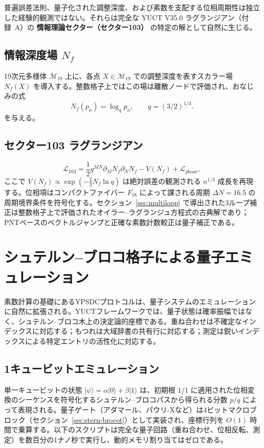 \documentclass[11pt,a4paper]{article}
\begin{document}
	普遍誤差法則、量子化された調整深度、および素数を支配する位相周期性は独立した経験的観測ではない。それらは完全な YUCT V35.0 ラグランジアン（付録~A）の \textbf{情報理論セクター（セクター103）} の特定の解として自然に生じる。
	
	\subsection{情報深度場 \(N_f\)}
	19次元多様体 \(\mathcal{M}_{19}\) 上に、各点 \(X \in \mathcal{M}_{19}\) での調整深度を表すスカラー場 \(N_f(X)\) を導入する。整数格子上ではこの場は離散ノードで評価され、おなじみの式
	\[
	N_f(p_n) = \log_q p_n, \qquad q = (3/2)^{1/3}.
	\]
	を与える。
	
	\subsection{セクター103 ラグランジアン}
	\[
	\mathcal{L}_{103} = \frac12 g^{MN}\partial_M N_f\partial_N N_f - V(N_f) + \mathcal{L}_{\mathrm{phase}},
	\]
	ここで \(V(N_f) \propto \exp(-\frac23 N_f\ln q)\) は絶対誤差の観測される \(n^{1/3}\) 成長を再現する。位相項はコンパクトファイバー \(F_{18}\) によって課される周期 \(\Delta N = 16.5\) の周期境界条件を符号化する。セクション~\ref{sec:multiloop} で導出された3ループ補正は整数格子上で評価されたオイラー–ラグランジュ方程式の古典解であり；PNTベースのベクトルジャンプと正確な素数計数較正は量子補正である。
	
	\section{シュテルン–ブロコ格子による量子エミュレーション}
	\label{sec:quantum-emulation}
	
	素数計算の基礎にあるYPSDCプロトコルは、量子システムのエミュレーションに自然に拡張される。YUCTフレームワークでは、量子状態は確率振幅ではなく、シュテルン–ブロコ木上の決定論的座標である。重ね合わせは不確定なインデックスに対応する；もつれは大域辞書の共有行に対応する；測定は鋭いインデックスによる特定エントリの活性化に対応する。
	
	\subsection{1キュービットエミュレーション}
	
	単一キュービットの状態 \(\vert\psi\rangle = \alpha\vert0\rangle + \beta\vert1\rangle\) は、初期根 \(1/1\) に適用された位相変換のシーケンスを符号化するシュテルン–ブロコパスから得られる分数 \(p/q\) によって表現される。量子ゲート（アダマール、パウリ-Xなど）は4ビットマクロブロック（セクション~\ref{sec:stern-brocot}）として実装され、座標行列を \(O(1)\) 時間で乗算する。以下のスクリプトは完全な量子回路（重ね合わせ、位相反転、測定）を数百分の1ナノ秒で実行し、動的メモリ割り当てはゼロである。
	
\end{document}
